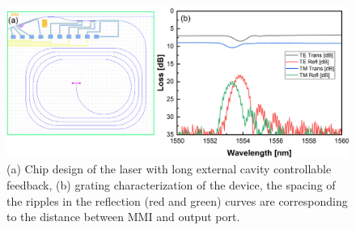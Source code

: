 \begin{figure}[ht]
    \centering
    \includegraphics[width=\linewidth]{figures/grating_5742.png}
    \caption{(a) Chip design of the laser with long external cavity controllable feedback, (b) grating characterization of the device, the spacing of the ripples in the reflection (red and green) curves are corresponding to the distance between MMI and output port.}
    \label{fig:grating_5742}
\end{figure}


